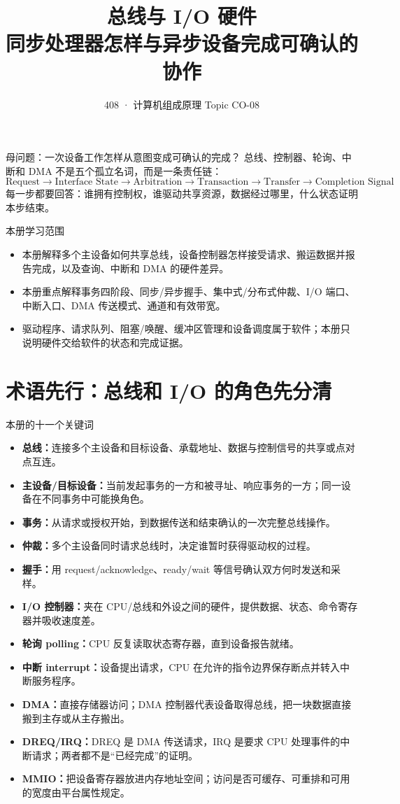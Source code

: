 \documentclass[UTF8,fontset=fandol,11pt,a4paper]{ctexart}
\title{\vspace{-1.1cm}\textbf{总线与 I/O 硬件}\\[0.4em]\large 同步处理器怎样与异步设备完成可确认的协作}
\author{408 · 计算机组成原理 Topic CO-08}
\date{}
\newcommand{\kw}[1]{\textbf{\color{deep}#1}}
\begin{document}
\maketitle

\begin{corebox}{母问题：一次设备工作怎样从意图变成可确认的完成？}
总线、控制器、轮询、中断和 DMA 不是五个孤立名词，而是一条责任链：
\[
\boxed{\text{Request}\to\text{Interface State}\to\text{Arbitration}\to\text{Transaction}\to\text{Transfer}\to\text{Completion Signal}}
\]
每一步都要回答：谁拥有控制权，谁驱动共享资源，数据经过哪里，什么状态证明本步结束。
\end{corebox}

\begin{methodbox}{本册学习范围}
\begin{itemize}
\item 本册解释多个主设备如何共享总线，设备控制器怎样接受请求、搬运数据并报告完成，以及查询、中断和 DMA 的硬件差异。
\item 本册重点解释事务四阶段、同步/异步握手、集中式/分布式仲裁、I/O 端口、中断入口、DMA 传送模式、通道和有效带宽。
\item 驱动程序、请求队列、阻塞/唤醒、缓冲区管理和设备调度属于软件；本册只说明硬件交给软件的状态和完成证据。
\end{itemize}
\end{methodbox}

\section{术语先行：总线和 I/O 的角色先分清}
\begin{methodbox}{本册的十一个关键词}
\begin{itemize}
\item \kw{总线：}连接多个主设备和目标设备、承载地址、数据与控制信号的共享或点对点互连。
\item \kw{主设备/目标设备：}当前发起事务的一方和被寻址、响应事务的一方；同一设备在不同事务中可能换角色。
\item \kw{事务：}从请求或授权开始，到数据传送和结束确认的一次完整总线操作。
\item \kw{仲裁：}多个主设备同时请求总线时，决定谁暂时获得驱动权的过程。
\item \kw{握手：}用 request/acknowledge、ready/wait 等信号确认双方何时发送和采样。
\item \kw{I/O 控制器：}夹在 CPU/总线和外设之间的硬件，提供数据、状态、命令寄存器并吸收速度差。
\item \kw{轮询 polling：}CPU 反复读取状态寄存器，直到设备报告就绪。
\item \kw{中断 interrupt：}设备提出请求，CPU 在允许的指令边界保存断点并转入中断服务程序。
\item \kw{DMA：}直接存储器访问；DMA 控制器代表设备取得总线，把一块数据直接搬到主存或从主存搬出。
\item \kw{DREQ/IRQ：}DREQ 是 DMA 传送请求，IRQ 是要求 CPU 处理事件的中断请求；两者都不是“已经完成”的证明。
\item \kw{MMIO：}把设备寄存器放进内存地址空间；访问是否可缓存、可重排和可用的宽度由平台属性规定。
\end{itemize}
\end{methodbox}
\end{document}
